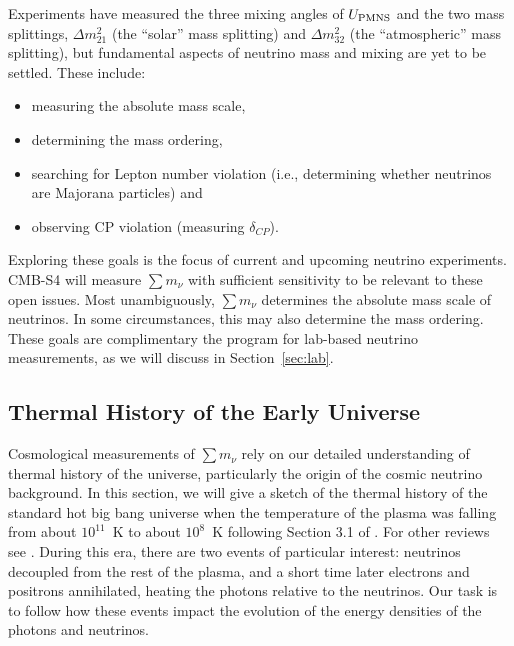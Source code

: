 Experiments have measured the three mixing angles of $U_{\rm PMNS}$ and the two mass splittings, $\Delta m^2_{21}$ (the ``solar'' mass splitting) and $\Delta m^2_{32}$ (the ``atmospheric'' mass splitting), but fundamental aspects of neutrino mass and mixing are yet to be settled. These include:
\begin{itemize}
\item measuring the absolute mass scale,
\item determining the mass ordering,
\item searching for Lepton number violation (i.e., determining whether neutrinos are Majorana particles) and
\item observing CP violation (measuring $\delta_{CP}$).
\end{itemize}
Exploring these goals is the focus of current and upcoming neutrino experiments. CMB-S4 will measure $ \sum m_\nu $ with sufficient sensitivity to be relevant to these open issues.  Most unambiguously, $\sum m_\nu$ determines  the absolute mass scale of neutrinos.  In some circumstances, this may also determine the mass ordering.  These goals are complimentary the program for lab-based neutrino measurements, as we will discuss in Section~\ref{sec:lab}.



\subsection{Thermal History of the Early Universe} \label{ThermalHistory}
Cosmological measurements of $\sum m_\nu$ rely on our detailed understanding of thermal history of the universe, particularly the origin of the cosmic neutrino background.  In this section, we will give a sketch of the thermal history of the standard hot big bang universe when the temperature of the plasma was falling from about $10^{11}$~K to about $10^8$~K following Section 3.1 of \cite{Weinberg:2008zzc}.  For other reviews see \cite{Dolgov:2002wy,Agashe:2014kda}.  During this era, there are two events of particular interest: neutrinos decoupled from the rest of the plasma, and a short time later electrons and positrons annihilated, heating the photons relative to the neutrinos.  Our task is to follow how these events impact the evolution of the energy densities of the photons and neutrinos.

